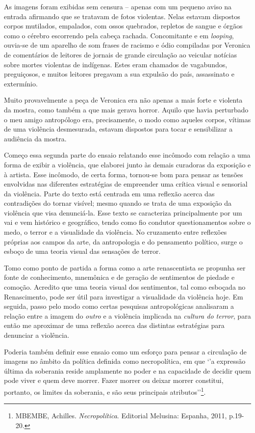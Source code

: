 As imagens foram exibidas sem censura -- apenas com um pequeno aviso na
entrada afirmando que se tratavam de fotos violentas. Nelas estavam
dispostos corpos mutilados, empalados, com ossos quebrados, repletos de
sangue e órgãos como o cérebro escorrendo pela cabeça rachada.
Concomitante e em \emph{looping}, ouvia-se de um aparelho de som frases
de racismo e ódio compiladas por Veronica de comentários de leitores de
jornais de grande circulação ao veicular notícias sobre mortes violentas
de indígenas. Estes eram chamados de vagabundos, preguiçosos, e muitos
leitores pregavam a sua expulsão do país, assassinato e extermínio.

Muito provavelmente a peça de Veronica era não apenas a mais forte e
violenta da mostra, como também a que mais gerava horror. Aquilo que
havia perturbado o meu amigo antropólogo era, precisamente, o modo como
aqueles corpos, vítimas de uma violência desmesurada, estavam dispostos
para tocar e sensibilizar a audiência da mostra.

Começo essa segunda parte do ensaio relatando esse incômodo com relação
a uma forma de exibir a violência, que elaborei junto às demais
curadoras da exposição e à artista. Esse incômodo, de certa forma,
tornou-se bom para pensar as tensões envolvidas nas diferentes
estratégias de empreender uma crítica visual e sensorial da violência.
Parte do texto está centrada em uma reflexão acerca das contradições do
tornar visível; mesmo quando se trata de uma exposição da violência que
visa denunciá-la. Esse texto se caracteriza principalmente por um vai e
vem histórico e geográfico, tendo como fio condutor questionamentos
sobre o medo, o terror e a visualidade da violência. No cruzamento entre
reflexões próprias aos campos da arte, da antropologia e do pensamento
político, surge o esboço de uma teoria visual das sensações de terror.

Tomo como ponto de partida a forma como a arte renascentista se propunha
ser fonte de conhecimento, mnemônica e de geração de sentimentos de
piedade e comoção. Acredito que uma teoria visual dos sentimentos, tal
como esboçada no Renascimento, pode ser útil para investigar a
visualidade da violência hoje. Em seguida, passo pelo modo como certas
pesquisas antropológicas analisaram a relação entre a imagem do
\emph{outro} e a violência implicada na \emph{cultura do terror}, para
então me aproximar de uma reflexão acerca das distintas estratégias para
denunciar a violência.

Poderia também definir esse ensaio como um esforço para pensar a
circulação de imagens no âmbito da política definida como necropolítica,
em que `'a expressão última da soberania reside amplamente no poder e na
capacidade de decidir quem pode viver e quem deve morrer. Fazer morrer
ou deixar morrer constitui, portanto, os limites da soberania, e são
seus principais atributos''\footnote{MBEMBE, Achilles.
  \emph{Necropolítica}. Editorial Melusina: Espanha, 2011, p.19-20.}.

